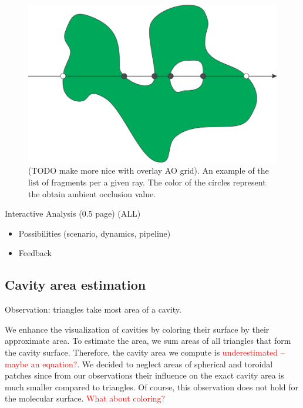 \begin{figure}[htb]
\centering
  \includegraphics[width=0.8\columnwidth]{image/ray_fragments.png}
  \caption{(TODO make more nice with overlay AO grid). An example of the list of fragments per a given ray. The color of the circles represent the obtain ambient occlusion value.}
	\label{fig:ray_fragments}
\end{figure}


Interactive Analysis (0.5 page) (ALL)
\begin{itemize}
  \item Possibilities (scenario, dynamics, pipeline)
  \item Feedback
\end{itemize}


\subsection{Cavity area estimation}
Observation: triangles take most area of a cavity.

We enhance the visualization of cavities by coloring their surface by their approximate area.
To estimate the area, we sum areas of all triangles that form the cavity surface.
Therefore, the cavity area we compute is \textcolor{red}{underestimated -- maybe an equation?}.
We decided to neglect areas of spherical and toroidal patches since from our observations their influence on the exact cavity area is much smaller compared to triangles.
Of course, this observation does not hold for the molecular surface.
\textcolor{red}{What about coloring?}
